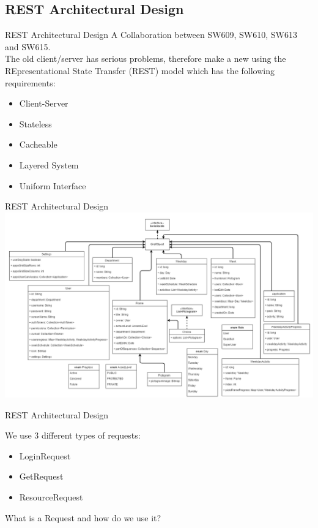 \subsection{REST Architectural Design}
\begin{frame}{REST Architectural Design}
A Collaboration between SW609, SW610, SW613 and SW615.\\

The old client/server has serious problems, therefore make a new using the REpresentational State Transfer (REST) model which has the following requirements:
\begin{itemize}
\item Client-Server
\item Stateless
\item Cacheable
\item Layered System
\item Uniform Interface
\end{itemize}
\end{frame}

\begin{frame}{REST Architectural Design}
\includegraphics[scale=0.3]{figures/Giraf_RestModelV3.PNG}
\end{frame}

\begin{frame}{REST Architectural Design}

We use 3 different types of requests:
\begin{itemize}
\item LoginRequest
\item GetRequest
\item ResourceRequest
\end{itemize}

What is a Request and how do we use it?

\end{frame}


